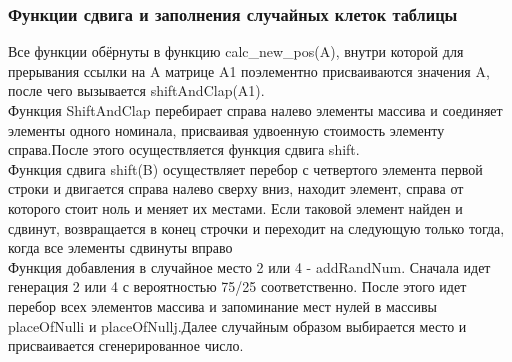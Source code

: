 \documentclass[a4paper,12pt]{article}
\begin{document}
\subsubsection{Функции сдвига и заполнения случайных клеток таблицы}
Все функции обёрнуты в функцию calc\_new\_pos(A), внутри которой для прерывания ссылки на A матрице A1 поэлементно присваиваются значения A, после чего вызывается shiftAndClap(A1).\\
Функция ShiftAndClap перебирает справа налево элементы массива и соединяет элементы одного номинала, присваивая удвоенную стоимость элементу справа.После этого осуществляется функция сдвига shift.\\
Функция сдвига shift(B) осуществляет перебор с четвертого элемента первой строки и двигается справа налево сверху вниз, находит элемент, справа от которого стоит ноль и меняет их местами. Если таковой элемент найден и сдвинут, возвращается в конец строчки и переходит на следующую только тогда, когда все элементы сдвинуты вправо\\
Функция добавления в случайное место 2 или 4 -  addRandNum. Сначала идет генерация 2 или 4 с вероятностью 75/25 соответственно. После этого идет перебор всех элементов массива и запоминание мест нулей в массивы placeOfNulli и placeOfNullj.Далее случайным образом выбирается место и присваивается сгенерированное число.\\
\end{document}
